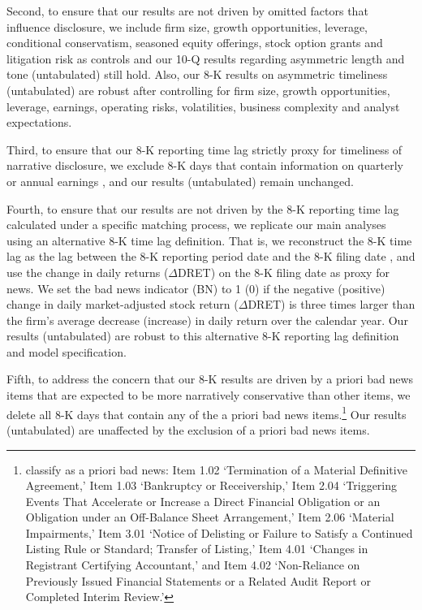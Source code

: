 \documentclass[letterpaper,12pt]{article}
\begin{document}
\begin{spacing}{1.5}
Second, to ensure that our results are not driven by omitted factors that influence disclosure, we include firm size, growth opportunities, leverage, conditional conservatism, seasoned equity offerings, stock option grants and litigation risk as controls and our 10-Q results regarding asymmetric length and tone (untabulated) still hold. Also, our 8-K results on asymmetric timeliness (untabulated) are robust after controlling for firm size, growth opportunities, leverage, earnings, operating risks, volatilities, business complexity and analyst expectations. 

Third, to ensure that our 8-K reporting time lag strictly proxy for timeliness of narrative disclosure, we exclude 8-K days that contain information on quarterly or annual earnings \cite{segalAreManagersStrategic2016}, and our results (untabulated) remain unchanged. 

Fourth, to ensure that our results are not driven by the 8-K reporting time lag calculated under a specific matching process, we replicate our main analyses using an alternative 8-K time lag definition. That is, we reconstruct the 8-K time lag as the lag between the 8-K reporting period date and the 8-K filing date \cite{carterRelevanceForm8K1999, niessnerStrategicDisclosureTiming2015, chapmanInformationOverloadDisclosure2019}, and use the change in daily returns ($\Delta$DRET) on the 8-K filing date as proxy for news. We set the bad news indicator (BN) to 1 (0) if the negative (positive) change in daily market-adjusted stock return ($\Delta$DRET) is three times larger than the firm's average decrease (increase) in daily return over the calendar year. Our results (untabulated) are robust to this alternative 8-K reporting lag definition and model specification. 


Fifth, to address the concern that our 8-K results are driven by a priori bad news items that are expected to be more narratively conservative than other items, we delete all 8-K days that contain any of the a priori bad news items.\footnote{ classify as a priori bad news: Item 1.02 `Termination of a Material Definitive Agreement,' Item 1.03 `Bankruptcy or Receivership,' Item 2.04 `Triggering Events That Accelerate or Increase a Direct Financial Obligation or an Obligation under an Off-Balance Sheet Arrangement,' Item 2.06 `Material Impairments,' Item 3.01 `Notice of Delisting or Failure to Satisfy a Continued Listing Rule or Standard; Transfer of Listing,' Item 4.01 `Changes in Registrant Certifying Accountant,' and Item 4.02 `Non-Reliance on Previously Issued Financial Statements or a Related Audit Report or Completed Interim Review.'} Our results (untabulated) are unaffected by the exclusion of a priori bad news items. 


\end{spacing}
\end{document}
